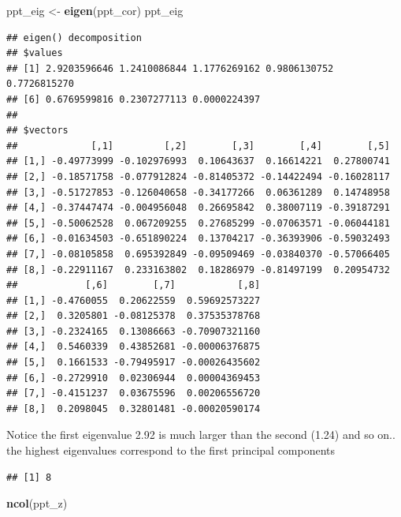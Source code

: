 \documentclass[]{article}
\newenvironment{Shaded}{\begin{snugshade}}{\end{snugshade}}
\newcommand{\KeywordTok}[1]{\textcolor[rgb]{0.13,0.29,0.53}{\textbf{#1}}}
\newcommand{\NormalTok}[1]{#1}
\newcommand{\OperatorTok}[1]{\textcolor[rgb]{0.81,0.36,0.00}{\textbf{#1}}}
\newcommand{\StringTok}[1]{\textcolor[rgb]{0.31,0.60,0.02}{#1}}
\begin{document}
\begin{Shaded}
\begin{Highlighting}[]
\NormalTok{ppt_eig <-}\StringTok{ }\KeywordTok{eigen}\NormalTok{(ppt_cor)}
\NormalTok{ppt_eig}
\end{Highlighting}
\end{Shaded}

\begin{verbatim}
## eigen() decomposition
## $values
## [1] 2.9203596646 1.2410086844 1.1776269162 0.9806130752 0.7726815270
## [6] 0.6769599816 0.2307277113 0.0000224397
## 
## $vectors
##             [,1]         [,2]        [,3]        [,4]        [,5]
## [1,] -0.49773999 -0.102976993  0.10643637  0.16614221  0.27800741
## [2,] -0.18571758 -0.077912824 -0.81405372 -0.14422494 -0.16028117
## [3,] -0.51727853 -0.126040658 -0.34177266  0.06361289  0.14748958
## [4,] -0.37447474 -0.004956048  0.26695842  0.38007119 -0.39187291
## [5,] -0.50062528  0.067209255  0.27685299 -0.07063571 -0.06044181
## [6,] -0.01634503 -0.651890224  0.13704217 -0.36393906 -0.59032493
## [7,] -0.08105858  0.695392849 -0.09509469 -0.03840370 -0.57066405
## [8,] -0.22911167  0.233163802  0.18286979 -0.81497199  0.20954732
##            [,6]        [,7]           [,8]
## [1,] -0.4760055  0.20622559  0.59692573227
## [2,]  0.3205801 -0.08125378  0.37535378768
## [3,] -0.2324165  0.13086663 -0.70907321160
## [4,]  0.5460339  0.43852681 -0.00006376875
## [5,]  0.1661533 -0.79495917 -0.00026435602
## [6,] -0.2729910  0.02306944  0.00004369453
## [7,] -0.4151237  0.03675596  0.00206556720
## [8,]  0.2098045  0.32801481 -0.00020590174
\end{verbatim}

Notice the first eigenvalue 2.92 is much larger than the second (1.24)
and so on.. the highest eigenvalues correspond to the first principal
components

\begin{Shaded}
\end{Shaded}

\begin{verbatim}
## [1] 8
\end{verbatim}

\begin{Shaded}
\begin{Highlighting}[]
\KeywordTok{ncol}\NormalTok{(ppt_z)}
\end{Highlighting}
\end{Shaded}
\end{document}

